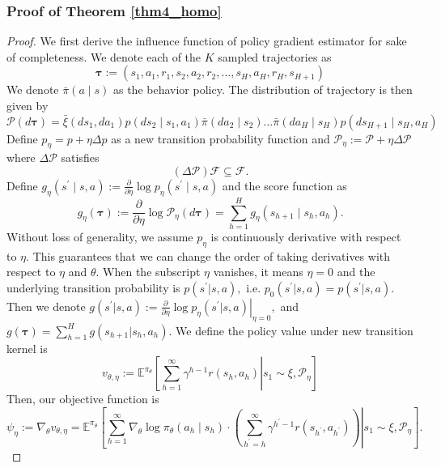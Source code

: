\documentclass{article}
\numberwithin{equation}{section}
\begin{document}
\subsubsection{Proof of Theorem \ref{thm4_homo}}
\label{pfthm4_homo}
\begin{proof}
We first derive the influence function of policy gradient estimator for sake of completeness. We denote each of the $K$ sampled trajectories as
$$
\boldsymbol{\tau}:=\left(s_{1}, a_{1}, r_{1}, s_{2}, a_{2}, r_{2}, \ldots, s_{H}, a_{H}, r_{H}, s_{H+1}\right)
$$
We denote $\bar{\pi}(a \mid s)$ as the behavior policy. The distribution of trajectory is then given by
$$
\mathcal{P}(d \boldsymbol{\tau})= \bar{\xi}\left(d s_{1}, d a_{1}\right) p\left(d s_{2} \mid s_{1}, a_{1}\right) \bar{\pi}\left(d a_{2} \mid s_{2}\right) \ldots \bar{\pi}\left(d a_{H} \mid s_{H}\right) p\left(d s_{H+1} \mid s_{H}, a_{H}\right)
$$
Define $p_{\eta} = p + \eta\Delta p$ as a new transition probability function and $\mathcal{P}_{\eta}:=\mathcal{P}+\eta \Delta\mathcal{P}$ where $\Delta \mathcal{P}$ satisfies
$$(\Delta \mathcal{P}) \mathcal{F} \subseteq \mathcal{F}.$$ 
Define $g_\eta\left(s^{\prime} \mid s, a\right):=\frac{\partial}{\partial \eta} \log p_\eta\left( s^{\prime} \mid s, a\right)$ and the score function as 
$$
g_{\eta}(\boldsymbol{\tau}):=\frac{\partial}{\partial \eta} \log \mathcal{P}_{\eta}(d \boldsymbol{\tau})=\sum_{h=1}^{H} g_{\eta}\left(s_{h+1} \mid s_{h}, a_{h}\right).
$$
Without loss of generality, we assume $p_{\eta}$ is continuously derivative with respect to $\eta.$ This guarantees that we can change the order of taking derivatives with respect to $\eta$ and $\theta.$ When the subscript $\eta$ vanishes, it means $\eta = 0$ and the underlying transition probability is $p(s^{\prime}|s,a),$ i.e. $p_0(s^{\prime} |s,a) = p(s^{\prime} |s,a).$ Then we denote $g(s^{\prime}|s,a) := \left.\frac{\partial}{\partial \eta}\log p_\eta(s^{\prime}|s,a)\right|_{\eta = 0},$ and $g(\boldsymbol{\tau}) = \sum_{h=1}^H g(s_{h+1}|s_h,a_h).$ We define the policy value under new transition kernel is
\begin{equation*}
    v_{\theta,\eta} := \mathbb{E}^{\pi_{\theta}} \left[\left.\sum_{h=1}^\infty\gamma^{h-1} r(s_h,a_h) \right| s_1 \sim \xi, \mathcal{P}_{\eta}\right]
\end{equation*}
Then, our objective function is
$$
\psi_{\eta} := \nabla_{\theta} v_{\theta,\eta} =\mathbb{E}^{\pi_{\theta}}\left[\left.\sum_{h=1}^\infty \nabla_{\theta} \log \pi_{\theta}\left(a_{h} \mid s_{h}\right) \cdot\left(\sum_{h^{\prime}=h}^{\infty} \gamma^{h^\prime-1}r\left(s_{h^{\prime}}, a_{h^{\prime}}\right)\right) \right| s_{1} \sim \xi, \mathcal{P}_{\eta}\right].
$$
\end{proof}
\end{document}
